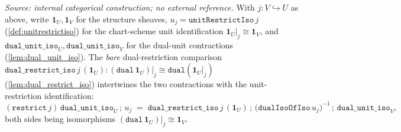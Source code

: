 \begin{lemma}


  \label{lem:dual_unit_iso_restrict_assemble}
  \textit{Source: internal categorical construction; no external reference.}
  With \(j : V \hookrightarrow U\) as above, write \(\mathbf 1_U, \mathbf 1_V\) for the structure
  sheaves, \(u_j = \mathtt{unitRestrictIso}\,j\) (\cref{def:unitrestrictiso}) for the chart-scheme
  unit identification \(\mathbf 1_U|_j \cong \mathbf 1_V\), and
  \(\mathtt{dual\_unit\_iso}_U, \mathtt{dual\_unit\_iso}_V\) for the dual-unit contractions
  (\cref{lem:dual_unit_iso}). The \emph{bare} dual-restriction comparison
  \(\mathtt{dual\_restrict\_iso}\,j\,(\mathbf 1_U) : (\mathtt{dual}\,\mathbf 1_U)|_j \cong
  \mathtt{dual}(\mathbf 1_U|_j)\) (\cref{lem:dual_restrict_iso}) intertwines the two contractions
  with the unit-restriction identification:
  \[
    (\mathtt{restrict}\,j)\,\mathtt{dual\_unit\_iso}_U \,\mathbin{;}\, u_j
      \;=\; \mathtt{dual\_restrict\_iso}\,j\,(\mathbf 1_U)
        \,\mathbin{;}\, \bigl(\mathtt{dualIsoOfIso}\,u_j\bigr)^{-1}
        \,\mathbin{;}\, \mathtt{dual\_unit\_iso}_V,
  \]
  both sides being isomorphisms \((\mathtt{dual}\,\mathbf 1_U)|_j \cong \mathbf 1_V\).
\end{lemma}
